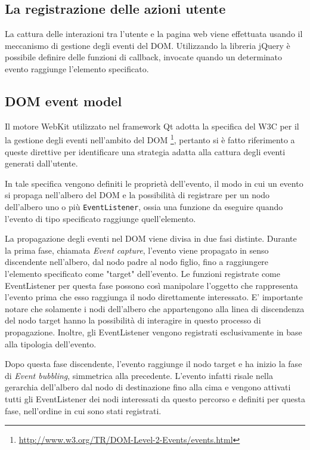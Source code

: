 \subsection{La registrazione delle azioni utente}

La cattura delle interazioni tra l'utente e la pagina web viene effettuata usando il meccanismo di gestione degli eventi del DOM. Utilizzando la libreria jQuery è possibile definire delle funzioni di callback, invocate quando un determinato evento raggiunge l'elemento specificato. 

\subsection{DOM event model}

Il motore WebKit utilizzato nel framework Qt adotta la specifica del W3C per il la gestione degli eventi nell'ambito del DOM \footnote{\url{http://www.w3.org/TR/DOM-Level-2-Events/events.html}}, pertanto si è fatto riferimento a queste direttive per identificare una strategia adatta alla cattura degli eventi generati dall'utente. 

In tale specifica vengono definiti le proprietà dell'evento, il modo in cui un evento si propaga nell'albero del DOM e la possibilità di registrare per un nodo dell'albero uno o più \verb|EventListener|, ossia una funzione da eseguire quando l'evento di tipo specificato raggiunge quell'elemento.

La propagazione degli eventi nel DOM viene divisa in due fasi distinte. Durante la prima fase, chiamata \emph{Event capture}, l'evento viene propagato in senso discendente nell'albero, dal nodo padre al nodo figlio, fino a raggiungere l'elemento specificato come "target" dell'evento. Le funzioni registrate come EventListener per questa fase possono così manipolare l'oggetto che rappresenta l'evento prima che esso raggiunga il nodo direttamente interessato. E' importante notare che solamente i nodi dell'albero che appartengono alla linea di discendenza del nodo target hanno la possibilità di interagire in questo processo di propagazione. Inoltre, gli EventListener vengono registrati esclusivamente in base alla tipologia dell'evento.

Dopo questa fase discendente, l'evento raggiunge il nodo target e ha inizio la fase di \emph{Event bubbling}, simmetrica alla precedente. L'evento infatti risale nella gerarchia dell'albero dal nodo di destinazione fino alla cima e vengono attivati tutti gli EventListener dei nodi interessati da questo percorso e definiti per questa fase, nell'ordine in cui sono stati registrati.

